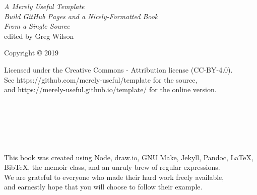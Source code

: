\documentclass[10pt,statementpaper]{memoir}
\begin{document}
\pagestyle{empty}

{\begingroup
  \raggedleft
  \vspace*{\baselineskip}

  {\Huge\itshape A Merely Useful Template}\\[\baselineskip]

  {\large\itshape
    Build GitHub Pages and a Nicely-Formatted Book\\
    From a Single Source
  }\\[0.2\textheight]

  {\large edited by Greg Wilson}\par

  \vfill

  {\large Copyright {\copyright} 2019}

  \vspace*{\baselineskip}


  \vspace*{\baselineskip}

  {\small
    Licensed under the Creative Commons - Attribution license (CC-BY-4.0).
    \\
    See https://github.com/merely-useful/template for the source,\\
    and https://merely-useful.github.io/template/ for the online version.
  }

\endgroup}

\newpage

\pagestyle{empty}

~

\newpage

\tableofcontents

\newpage
\listoffigures

\newpage
\pagestyle{empty}

~

\newpage
\listoftables

\newpage
\pagestyle{empty}

~

\newpage

\pagestyle{plain}



\cleartoverso
{\begingroup
  \raggedleft
  \vspace*{4\baselineskip}
  This book was created using Node, draw.io, GNU Make, Jekyll, Pandoc, LaTeX, BibTeX, the memoir class,
  and an unruly brew of regular expressions. \\
  We are grateful to everyone who made their hard work freely available, \\
  and earnestly hope that you will choose to follow their example.

\endgroup}
\end{document}
